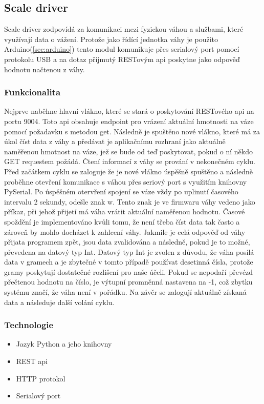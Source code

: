 

\subsection{Scale driver}\label{subsec:scale-driver}
Scale driver zodpovídá za komunikaci mezi fyzickou váhou a službami, které využívají data o vážení.\newline
Protože jako řídící jednotka váhy je použito Arduino(\ref{sec:arduino}) tento modul komunikuje přes serialový port pomocí protokolu USB a na dotaz přijmutý RESTovým api poskytne jako odpověď hodnotu načtenou z váhy.

\subsubsection{Funkcionalita}
Nejprve naběhne hlavní vlákno, které se stará o poskytování RESTového api na portu 9004.
Toto api obsahuje endpoint pro vrázení aktuální hmotnosti na váze pomocí požadavku s metodou get.
Následně je spuštěno nové vlákno, které má za úkol číst data z váhy a předávat je aplikačnímu rozhraní jako aktuálně naměřenou hmotnost na váze, jež se bude od teď poskytovat, pokud o ní někdo GET requestem požádá.
Čtení informací z váhy se prování v nekonečném cyklu.
Před začátkem cyklu se zaloguje že je nové vlákno úspěšně spuštěno a následně proběhne otevření komunikace s váhou přes seriový port s využitím knihovny PySerial.
Po úspěšném otervření spojení se váze vždy po uplinutí časového intervalu 2 sekundy, odešle znak w.
Tento znak je ve firmwaru váhy vedeno jako příkaz, při jehož přijetí má váha vrátit aktuální naměřenou hodnotu.
Časové spoždění je implementováno kvůli tomu, že není třeba číst data tak často a zároveň by mohlo docházet k zahlcení váhy.
Jakmile je celá odpověď od váhy přijata programem zpět, jsou data zvalidována a následně, pokud je to možné, převedena na datový typ Int.
Datový typ Int je zvolen z důvodu, že váha posílá data v gramech a je zbytečné v tomto případě používat desetinná čísla, protože gramy poskytují dostatečné rozlišení pro naše účeli.
Pokud se nepodaří převézd přečtenou hodnotu na číslo, je výtupní promněnná nastavena na -1, což zbytku systému značí, že váha není v pořádku.
Na závěr se zalogují aktuálně získaná data a následuje další volání cyklu.

\subsubsection{Technologie}
\begin{itemize}
    \item Jazyk Python a jeho knihovny
    \item REST api
    \item HTTP protokol
    \item Serialový port
\end{itemize}

